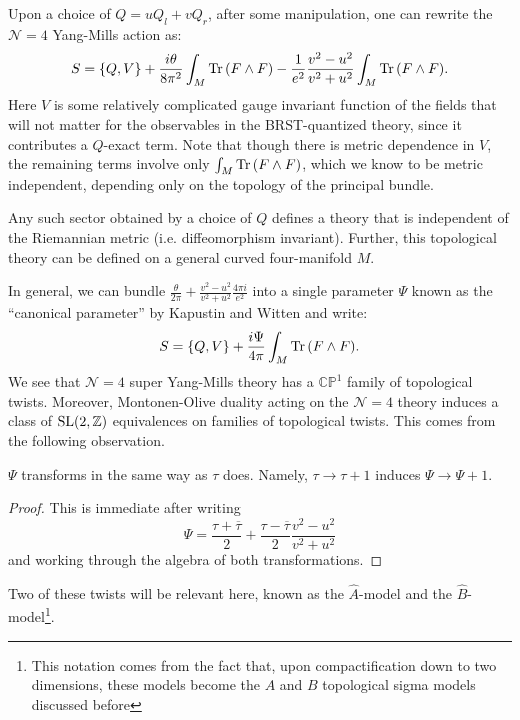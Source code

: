 	Upon a choice of $Q = u Q_l + v Q_r$, after some manipulation, one can rewrite the $\mathcal N=4$ Yang-Mills action as:
	\begin{equation}
		S = \{ Q , V \} + \frac{i \theta}{8\pi^2} \int_M \mathrm{Tr}\,(F \wedge F) - \frac{1}{e^2} \frac{v^2-u^2}{v^2+u^2} \int_M \mathrm{Tr}\, (F \wedge F).
	\end{equation}
	Here $V$ is some relatively complicated gauge invariant function of the fields that will not matter for the observables in the BRST-quantized theory, since it contributes a $Q$-exact term. Note that though there is metric dependence in $V$, the remaining terms involve only $\int_M \mathrm{Tr}\, (F \wedge F)$, which we know to be metric independent, depending only on the topology of the principal bundle. 
	
	\begin{fact}
		Any such sector obtained by a choice of $Q$ defines a theory that is independent of the Riemannian metric (i.e. diffeomorphism invariant). Further, this topological theory can be defined on a general curved four-manifold $M$.
	\end{fact}
	
	In general, we can bundle $\frac{\theta}{2\pi} +  \frac{v^2-u^2}{v^2+u^2} \frac{4\pi i}{e^2}$ into a single parameter $\Psi$ known as the ``canonical parameter'' by Kapustin and Witten \cite{kapustin2006} and write:
	\[
		S = \{ Q, V\} + \frac{i \Psi}{4\pi} \int_M \mathrm{Tr}\, (F \wedge F).
	\]
	We see that $\mathcal N = 4$ super Yang-Mills theory has a $\mathbb{CP}^1$ family of topological twists. Moreover, Montonen-Olive duality acting on the $\mathcal N=4$ theory induces a class of $\mathrm{SL}(2, \mathbb{Z})$ equivalences on families of topological twists. This comes from the following observation. 
	\begin{obs}
		$\Psi$ transforms in the same way as $\tau$ does. Namely, $\tau \to \tau+1$ induces $\Psi \to \Psi + 1$.
	\end{obs}
	\begin{proof}
		This is immediate after writing
		\[
			\Psi = \frac{\tau + \overline \tau}{2} + \frac{\tau - \overline \tau}{2} \frac{v^2-u^2}{v^2+u^2}
		\]
		and working through the algebra of both transformations.
	\end{proof}
	
	\noindent Two of these twists will be relevant here, known as the $\hat A$-model and the $\hat B$-model\footnote{This notation comes from the fact that, upon compactification down to two dimensions, these models become the $A$ and $B$ topological sigma models discussed before}. %
	
